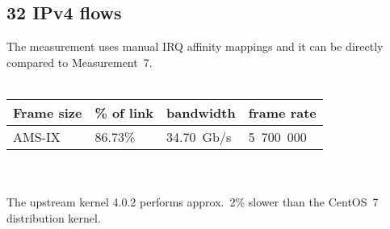 
\subsection{32 IPv4 flows}
The measurement uses manual IRQ affinity mappings
and it can be directly compared to Measurement~7.
\\
\\
\begin{tabular}{ | l | l | l | l | }
\hline
Frame size & \% of link & bandwidth & frame rate \\
\hline
AMS-IX & 86.73\% & 34.70~Gb/s & 5~700~000 \\
\hline
\end{tabular}
\\
\\
The upstream kernel 4.0.2 performs approx.~2\% slower than the CentOS~7 distribution kernel.
